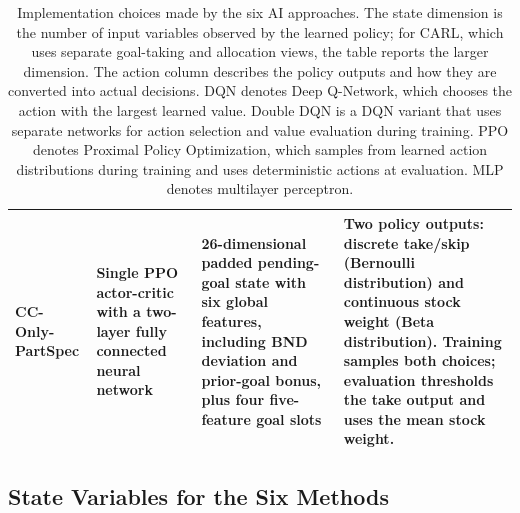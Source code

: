 \documentclass[mnsc,sglanonrev]{informs4}
\begin{document}
\begin{APPENDICES}
\begin{table}[H]
\begin{tabular}{@{}p{}p{}p{}p{}@{}}
\textbf{CC-Only-PartSpec} & Single PPO actor-critic with a two-layer fully connected neural network & 26-dimensional padded pending-goal state with six global features, including BND deviation and prior-goal bonus, plus four five-feature goal slots & Two policy outputs: discrete take/skip (Bernoulli distribution) and continuous stock weight (Beta distribution). Training samples both choices; evaluation thresholds the take output and uses the mean stock weight.\\
\bottomrule
\end{tabular}
\caption{Implementation choices made by the six AI approaches. The state dimension is the number of input variables observed by the learned policy; for CARL, which uses separate goal-taking and allocation views, the table reports the larger dimension. The action column describes the policy outputs and how they are converted into actual decisions. DQN denotes Deep Q-Network, which chooses the action with the largest learned value. Double DQN is a DQN variant that uses separate networks for action selection and value evaluation during training. PPO denotes Proximal Policy Optimization, which samples from learned action distributions during training and uses deterministic actions at evaluation. MLP denotes multilayer perceptron.}
\label{tab:gbwm-policy-implementations}
\end{table}


\subsection{State Variables for the Six Methods} \label{app:state-var}


\end{APPENDICES}
\end{document}
